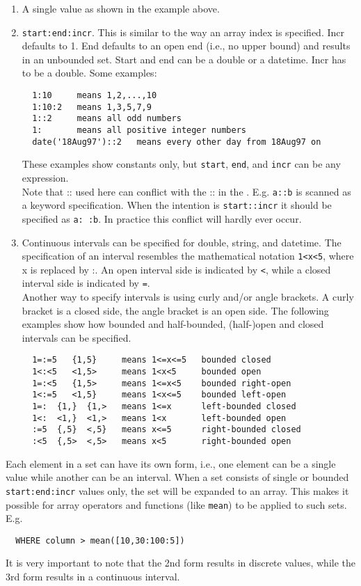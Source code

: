 \begin{enumerate}
\item A single value as shown in the example above.
\item \texttt{start:end:incr}. This is similar to the
way an array index is specified. Incr defaults to 1.
End defaults to an open end (i.e., no upper bound) and results
in an unbounded set. Start and end can be a double or a datetime.
Incr has to be a double. Some examples:
\begin{verbatim}
  1:10     means 1,2,...,10
  1:10:2   means 1,3,5,7,9
  1::2     means all odd numbers
  1:       means all positive integer numbers
  date('18Aug97')::2   means every other day from 18Aug97 on
\end{verbatim}
These examples show constants only, but \texttt{start}, \texttt{end},
and \texttt{incr} can be any expression.
\\Note that :: used here can conflict with the :: in the
. E.g. \texttt{a::b} is scanned as
a keyword specification. When the intention is \texttt{start::incr}
it should be specified as \texttt{a: :b}. In practice this conflict
will hardly ever occur.
\item Continuous intervals can be specified for double, string, and datetime.
The specification of an interval resembles the mathematical notation
\texttt{1<x<5}, where x is replaced by :. An open interval side
is indicated by \texttt{<}, while a closed interval side is indicated
by \texttt{=}.
\\Another way to specify intervals is using curly and/or angle brackets.
A curly bracket is a closed side, the angle bracket is an open side.
The following examples show how bounded and half-bounded,
(half-)open and closed intervals can be specified.
\begin{verbatim}
  1=:=5   {1,5}     means 1<=x<=5   bounded closed
  1<:<5   <1,5>     means 1<x<5     bounded open
  1=:<5   {1,5>     means 1<=x<5    bounded right-open
  1<:=5   <1,5}     means 1<x<=5    bounded left-open
  1=:  {1,}  {1,>   means 1<=x      left-bounded closed
  1<:  <1,}  <1,>   means 1<x       left-bounded open
  :=5  {,5}  <,5}   means x<=5      right-bounded closed
  :<5  {,5>  <,5>   means x<5       right-bounded open
\end{verbatim}
\end{enumerate}
Each element in a set can have its own form, i.e., one element can
be a single value while another can be an interval.
When a set consists of single or bounded
\texttt{start:end:incr} values only, the set will be expanded to an
array.
This makes it possible for array operators and functions
(like \texttt{mean}) to be applied to such sets. E.g.
\begin{verbatim}
  WHERE column > mean([10,30:100:5])
\end{verbatim}
It is very important to note that the 2nd form results in
discrete values, while the 3rd form results in a continuous interval.

